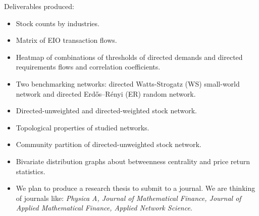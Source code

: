 \vline

Deliverables produced:

\begin{itemize}
	\item Stock counts by industries.
	\item Matrix of EIO transaction flows.
	\item Heatmap of combinations of thresholds of directed demands and directed requirements flows and correlation coefficients.
	\item Two benchmarking networks: directed Watts-Strogatz (WS) small-world network and directed Erdős–Rényi (ER) random network.
	\item Directed-unweighted and directed-weighted stock network.
	\item Topological properties of studied networks.
	\item Community partition of directed-unweighted stock network.
	\item Bivariate distribution graphs about betweenness centrality and price return statistics.
	\item We plan to produce a research thesis to submit to a journal. We are thinking of journals like:  \textit{Physica A, Journal of Mathematical Finance, Journal of Applied Mathematical Finance, Applied Network Science}.
\end{itemize}

